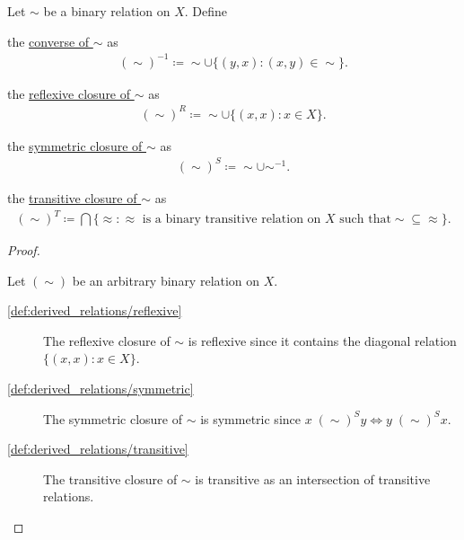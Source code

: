 \begin{definition}\label{def:derived_relations}
  Let $\sim$ be a binary relation on $X$. Define
  \begin{defenum}
    \item\label{def:derived_relations/converse} the \ul{converse of $\sim$} as
    \begin{align*}
      (\sim)^{-1} \coloneqq \sim \cup \{ (y, x) \colon (x, y) \in \sim \}.
    \end{align*}

    \item\label{def:derived_relations/reflexive} the \ul{reflexive closure of $\sim$} as
    \begin{align*}
      (\sim)^R \coloneqq \sim \cup \{ (x, x) \colon x \in X \}.
    \end{align*}

    \item\label{def:derived_relations/symmetric} the \ul{symmetric closure of $\sim$} as
    \begin{align*}
      (\sim)^S \coloneqq \sim \cup \sim^{-1}.
    \end{align*}

    \item\label{def:derived_relations/transitive} the \ul{transitive closure of $\sim$} as
    \begin{align*}
      (\sim)^T \coloneqq \bigcap \{ \approx \colon \approx \text{ is a binary transitive relation on $X$ such that} \sim \subseteq \approx \}.
    \end{align*}
  \end{defenum}
\end{definition}
\begin{proof}
\begin{itemize}
  Let $(\sim)$ be an arbitrary binary relation on $X$.

  \begin{description}
    \item[\ref{def:derived_relations/reflexive}] The reflexive closure of $\sim$ is reflexive since it contains the diagonal relation $\{ (x, x) \colon x \in X \}$.

    \item[\ref{def:derived_relations/symmetric}] The symmetric closure of $\sim$ is symmetric since $x \;(\sim)^S y \iff y \;(\sim)^S x$.

    \item[\ref{def:derived_relations/transitive}] The transitive closure of $\sim$ is transitive as an intersection of transitive relations.
  \end{description}
\end{itemize}
\end{proof}

